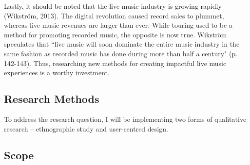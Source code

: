 Lastly, it should be noted that the live music industry is growing rapidly (Wikstr\"{o}m, 2013). The digital revolution caused record sales to plummet, whereas live music revenues are larger than ever. While touring used to be a method for promoting recorded music, the opposite is now true. Wikstr\"{o}m speculates that ``live music will soon dominate the entire music industry in the same fashion as recorded music has done during more than half a century" (p. 142-143). Thus, researching new methods for creating impactful live music experiences is a worthy investment.

\subsection{Research Methods}

To address the research question, I will be implementing two forms of qualitative research -- ethnographic study and user-centred design.





\subsection{Scope}

